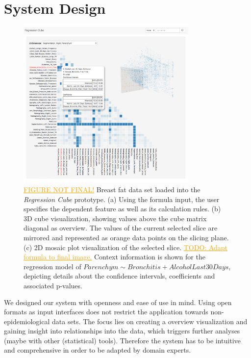\documentclass[journal]{style/vgtc} 			          %
\newcommand{\com}[1]{\textcolor{orange}{\uline{#1}}}
\begin{document}
\section{System Design} \label{sec:SystemDesign}
\begin{figure}[htb]
 \centering
 \includegraphics[width=3.5in]{figures/system_sketch}
 \caption{
 \com{FIGURE NOT FINAL!}
 Breast fat data set loaded into the \emph{Regression Cube} prototype.
 (a) Using the formula input, the user specifies the dependent feature as well as its calculation rules.
 (b) 3D cube visualization, showing values above the cube matrix diagonal as overview.
 The values of the current selected slice are mirrored and represented as orange data points on the slicing plane.
 (c) 2D mosaic plot visualization of the selected slice.
 \com{TODO: Adapt formula to final image.}
 Context information is shown for the regression model of $Parenchym \sim Bronchitis + AlcoholLast30Days$, depicting details about the confidence intervals, coefficients and associated p-values.
 }
  \label{fig:System}
\end{figure}
We designed our system with openness and ease of use in mind.
Using open formats as input interfaces does not restrict the application towards non-epidemiological data sets.
The focus lies on creating a overview visualization and gaining insight into relationships into the data, which triggers further analyses (maybe with other (statistical) tools).
Therefore the system has to be intuitive and comprehensive in order to be adapted by domain experts.
\\\\
\end{document}
